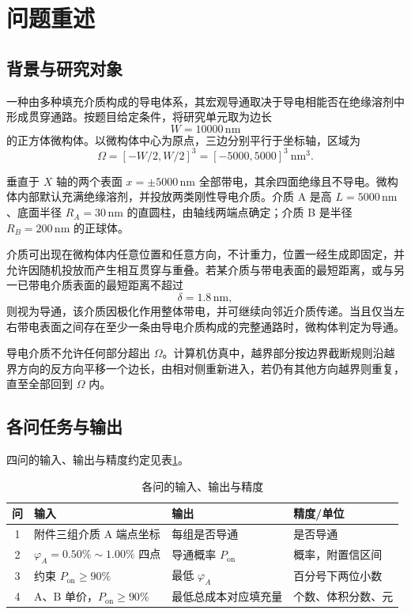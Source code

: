 \documentclass[UTF8,a4paper,zihao=-4,fontset=none]{ctexart}
\begin{document}
\clearpage

\section{问题重述}

\subsection{背景与研究对象}

一种由多种填充介质构成的导电体系，其宏观导通取决于导电相能否在绝缘溶剂中形成贯穿通路。按题目给定条件，将研究单元取为边长
\[
W=10000\,\mathrm{nm}
\]
的正方体微构体。以微构体中心为原点，三边分别平行于坐标轴，区域为
\[
\Omega=[-W/2,W/2]^3=[-5000,5000]^3\ \mathrm{nm}^3.
\]

垂直于 $X$ 轴的两个表面 $x=\pm 5000\,\mathrm{nm}$ 全部带电，其余四面绝缘且不导电。微构体内部默认充满绝缘溶剂，并投放两类刚性导电介质。介质 A 是高 $L=5000\,\mathrm{nm}$、底面半径 $R_A=30\,\mathrm{nm}$ 的直圆柱，由轴线两端点确定；介质 B 是半径 $R_B=200\,\mathrm{nm}$ 的正球体。

介质可出现在微构体内任意位置和任意方向，不计重力，位置一经生成即固定，并允许因随机投放而产生相互贯穿与重叠。若某介质与带电表面的最短距离，或与另一已带电介质表面的最短距离不超过
\[
\delta=1.8\,\mathrm{nm},
\]
则视为导通，该介质因极化作用整体带电，并可继续向邻近介质传递。当且仅当左右带电表面之间存在至少一条由导电介质构成的完整通路时，微构体判定为导通。

导电介质不允许任何部分超出 $\Omega$。计算机仿真中，越界部分按边界截断规则沿越界方向的反方向平移一个边长，由相对侧重新进入，若仍有其他方向越界则重复，直至全部回到 $\Omega$ 内。

\subsection{各问任务与输出}

四问的输入、输出与精度约定见表\ref{tab:io}。

\begin{table}[H]
\centering
\caption{各问的输入、输出与精度}
\label{tab:io}
\begin{tabularx}{\textwidth}{c>{\raggedright\arraybackslash}p{4.4cm}X>{\raggedright\arraybackslash}p{3.2cm}}
\toprule
问 & 输入 & 输出 & 精度/单位 \\
\midrule
1 & 附件三组介质 A 端点坐标 & 每组是否导通 & 是否导通 \\
2 & $\varphi_A=0.50\%\sim 1.00\%$ 四点 & 导通概率 $P_{\mathrm{on}}$ & 概率，附置信区间 \\
3 & 约束 $P_{\mathrm{on}}\ge 90\%$ & 最低 $\varphi_A$ & 百分号下两位小数 \\
4 & A、B 单价，$P_{\mathrm{on}}\ge 90\%$ & 最低总成本对应填充量 & 个数、体积分数、元 \\
\bottomrule
\end{tabularx}
\end{table}
\end{document}
